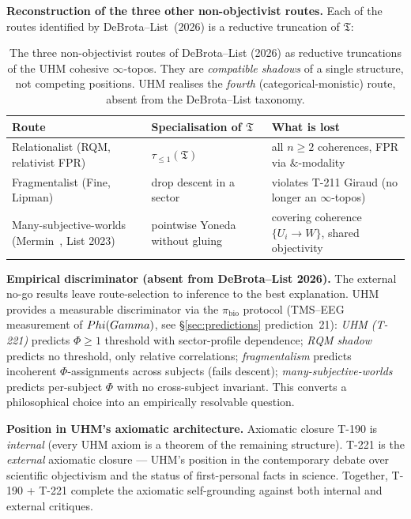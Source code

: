 \textbf{Reconstruction of the three other non-objectivist routes.}
Each of the routes identified by DeBrota--List~(2026) is a reductive
truncation of $\mathfrak T$:

\begin{table}[H]
\centering\small
\begin{tabular}{@{}p{4.2cm} p{4.5cm} p{5cm}@{}}
\toprule
\textbf{Route} & \textbf{Specialisation of $\mathfrak T$} & \textbf{What is lost} \\
\midrule
Relationalist (RQM, relativist FPR) & $\tau_{\leq 1}(\mathfrak T)$ & all $n \geq 2$ coherences, FPR via $\&$-modality \\
\midrule
Fragmentalist (Fine, Lipman) & drop descent in a sector & violates T-211 Giraud (no longer an $\infty$-topos) \\
\midrule
Many-subjective-worlds (Mermin~\citep{mermin2019better}, List 2023) & pointwise Yoneda without gluing & covering coherence $\{U_i \to W\}$, shared objectivity \\
\bottomrule
\end{tabular}
\caption{The three non-objectivist routes of DeBrota--List (2026) as reductive truncations of the UHM cohesive $\infty$-topos. They are \emph{compatible shadows} of a single structure, not competing positions. UHM realises the \emph{fourth} (categorical-monistic) route, absent from the DeBrota--List taxonomy.}
\label{tab:t221-routes}
\end{table}

\textbf{Empirical discriminator (absent from DeBrota--List 2026).}
The external no-go results leave route-selection to inference to the
best explanation. UHM provides a measurable discriminator via the
$\pi_{\mathrm{bio}}$ protocol (TMS--EEG measurement of $Phi(Gamma)$,
see \S\ref{sec:predictions} prediction~21):
\emph{UHM (T-221)} predicts $\Phi \geq 1$ threshold with
sector-profile dependence; \emph{RQM shadow} predicts no threshold,
only relative correlations; \emph{fragmentalism} predicts incoherent
$\Phi$-assignments across subjects (fails descent);
\emph{many-subjective-worlds} predicts per-subject $\Phi$ with no
cross-subject invariant. This converts a philosophical choice into
an empirically resolvable question.

\textbf{Position in UHM's axiomatic architecture.}
Axiomatic closure T-190 is \emph{internal} (every UHM axiom is a
theorem of the remaining structure). T-221 is the \emph{external}
axiomatic closure --- UHM's position in the contemporary debate over
scientific objectivism and the status of first-personal facts in
science. Together, T-190 + T-221 complete the axiomatic
self-grounding against both internal and external critiques.

